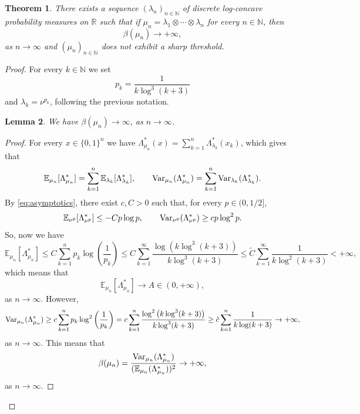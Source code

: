 \documentclass[11pt,a4paper]{article} %
\newtheorem{theorem}{Theorem}[section]
\newtheorem{lemma}[theorem]{Lemma}
\theoremstyle{definition}
\theoremstyle{remark}
\newcommand{\1}{\mathds{1}}
\begin{document}
    \begin{theorem}\label{th:discr-prod}
        There exists a sequence $(\lambda_n)_{n \in \mathbb{N}}$ of discrete log-concave probability measures on $\mathbb{R}$ such that if $\mu_n= \lambda_1 \otimes\cdots\otimes \lambda_n$ for every $n \in \mathbb{N}$, then $$\beta(\mu_n) \to +\infty,$$ as $n \to \infty$ and  $(\mu_n)_{n \in \mathbb{N}}$ does not exhibit a sharp threshold.
    \end{theorem}

    \begin{proof}
        For every $k \in \mathbb{N}$ we set $$p_k=\frac{1}{k \log^3(k+3)}$$ and  $\lambda_k=\nu^{p_k}$, following the previous notation. 
        
        \begin{lemma}
            We have $\beta(\mu_n) \to \infty$, as $n \to \infty$.
        \end{lemma}

\begin{proof}
    

        For every $x \in \{0,1\}^n$ we have $\Lambda^{\ast}_{\mu_n}(x)= \sum\limits_{k=1}^{n} \Lambda^{\ast}_{\lambda_k}(x_k)$, which gives that $$ \mathbb{E}_{\mu_n}[\Lambda^{\ast}_{\mu_n}]=\sum\limits_{k=1}^{n} \mathbb{E}_{\lambda_k}[\Lambda^{\ast}_{\lambda_k}], \qquad {\rm Var}_{\mu_n}(\Lambda^{\ast}_{\mu_n})=\sum\limits_{k=1}^{n} {\rm Var}_{\lambda_k}(\Lambda^{\ast}_{\lambda_k}).$$ By \eqref{eq:asymptotics}, there exist $c,C>0$ such that, for every $p \in (0,1/2]$,
        $$\mathbb{E}_{\nu^p}[\Lambda^{\ast}_{\nu^p}] \leq -Cp \log p, \qquad {\rm Var}_{\nu^p}(\Lambda^{\ast}_{\nu^p}) \geq cp \log^2 p. $$ So, now we have $$\mathbb{E}_{\mu_n}[\Lambda^{\ast}_{\mu_n}] \leq C \sum\limits_{k=1}^{n} p_k \log\left(\frac{1}{p_k}\right) \leq C \sum\limits_{k=1}^{\infty} \frac{\log\left(k \log^3(k+3)\right)}{k \log^3(k+3)} \leq \tilde{C}\sum\limits_{k=1}^{\infty}\frac{1}{k \log^2(k+3) }< +\infty,$$ which means that $$\mathbb{E}_{\mu_n}[\Lambda^{\ast}_{\mu_n}] \to A \in (0,+\infty),$$ as $n \to \infty$. However, $${\rm Var}_{\mu_n}(\Lambda^{\ast}_{\mu_n}) \geq c\sum\limits_{k=1}^{n}p_k \log^2\left(\frac{1}{p_k}\right)=c\sum\limits_{k=1}^{n} \frac{\log^2\left(k \log^3(k+3)\right)}{k \log^3(k+3)}\geq \tilde{c} \sum\limits_{k=1}^{n} \frac{1}{k \log(k+3)} \to +\infty,$$ as $n \to \infty$. This means that $$\beta(\mu_n)=\frac{{\rm Var}_{\mu_n}(\Lambda^{\ast}_{\mu_n})}{(\mathbb{E}_{\mu_n}(\Lambda^{\ast}_{\mu_n}))^2} \to +\infty,$$ as $n \to \infty$.   \end{proof}


\end{proof}
\end{document}
